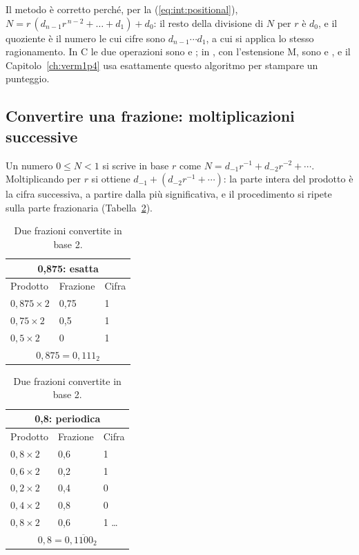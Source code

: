 Il metodo è corretto perché, per la (\ref{eq:int:positional}),
$N = r\,(d_{n-1}r^{\,n-2}+\dots+d_1) + d_0$: il resto della divisione di $N$
per $r$ è $d_0$, e il quoziente è il numero le cui cifre sono
$d_{n-1}\cdots d_1$, a cui si applica lo stesso ragionamento. In C le due
operazioni sono \code{/} e \code{\%}; in \riscv, con l'estensione M, sono
 e , e il Capitolo~\ref{ch:verm1p4} usa esattamente questo
algoritmo per stampare un punteggio.

\subsection{Convertire una frazione: moltiplicazioni successive}

Un numero $0\le N<1$ si scrive in base $r$ come
$N = d_{-1}r^{-1}+d_{-2}r^{-2}+\cdots$. Moltiplicando per $r$ si ottiene
$d_{-1} + (d_{-2}r^{-1}+\cdots)$: la parte intera del prodotto è la cifra
successiva, a partire dalla più significativa, e il procedimento si ripete
sulla parte frazionaria (Tabella~\ref{tab:int:fraction}).

\begin{table}[htb]
\centering\small
\caption{Due frazioni convertite in base 2.}\label{tab:int:fraction}
\begin{tabular}{@{}lll@{}}
\multicolumn{3}{c}{0,875: esatta}\\\toprule
Prodotto & Frazione & Cifra\\\midrule
$0,875\times 2$ & 0,75 & 1\\ $0,75\times 2$ & 0,5 & 1\\ $0,5\times 2$ & 0 & 1\\\bottomrule
\multicolumn{3}{c}{$0,875 = 0,111_2$}
\end{tabular}\qquad\qquad
\begin{tabular}{@{}lll@{}}
\multicolumn{3}{c}{0,8: periodica}\\\toprule
Prodotto & Frazione & Cifra\\\midrule
$0,8\times 2$ & 0,6 & 1\\ $0,6\times 2$ & 0,2 & 1\\ $0,2\times 2$ & 0,4 & 0\\ $0,4\times 2$ & 0,8 & 0\\ $0,8\times 2$ & 0,6 & 1 \ldots\\\bottomrule
\multicolumn{3}{c}{$0,8 = 0,\overline{1100}_2$}
\end{tabular}
\end{table}

